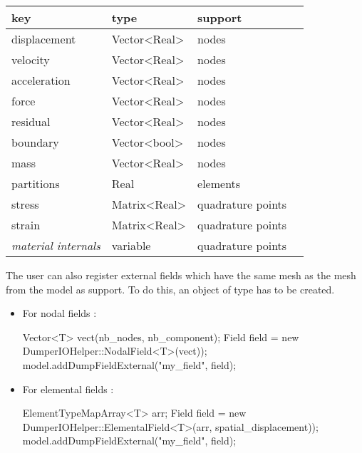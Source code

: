 \begin{tabular}{llll}
  \toprule
  key          &    type      & support \\
  \midrule
  displacement & Vector<Real> & nodes  \\
  velocity     & Vector<Real> & nodes  \\
  acceleration & Vector<Real> & nodes  \\
  force	       & Vector<Real> & nodes  \\
  residual     & Vector<Real> & nodes  \\
  boundary     & Vector<bool> & nodes  \\
  mass         & Vector<Real> & nodes  \\
  partitions   & Real         & elements \\
  stress & Matrix<Real> & quadrature points  \\
  strain & Matrix<Real> & quadrature points  \\
  \textit{material internals} & variable  & quadrature points  \\
\bottomrule
\end{tabular}


The user can also register external fields which have the same mesh as the mesh from the model as support. To do this, an object of type  has to be created.

\begin{itemize}
\item For nodal fields :
\begin{cpp}
  Vector<T> vect(nb_nodes, nb_component);
  Field field = new DumperIOHelper::NodalField<T>(vect));
  model.addDumpFieldExternal("my_field", field);
\end{cpp}

\item For elemental fields :
\begin{cpp}
  ElementTypeMapArray<T> arr;
  Field field = new DumperIOHelper::ElementalField<T>(arr, spatial_displacement));
  model.addDumpFieldExternal("my_field", field);
\end{cpp}
\end{itemize}


